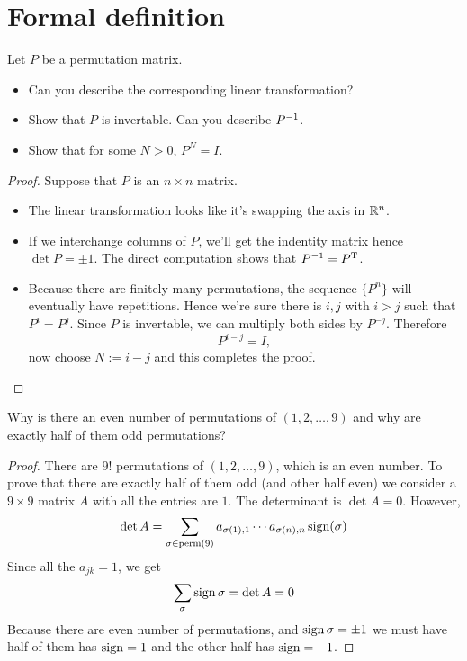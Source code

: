 \section{Formal definition}
\setcounter{exercise}{1}
\begin{exercise}
  Let $P$ be a permutation matrix.
  \begin{itemize}
    \item Can you describe the corresponding linear
      transformation?
    \item Show that $P$ is invertable. Can you describe $P^{-1}$.
    \item Show that for some $N>0$, $P^N=I$.
  \end{itemize}
\end{exercise}
\begin{proof}
  Suppose that $P$ is an $n\times n$ matrix.
  \begin{itemize}
    \item The linear transformation looks like it's swapping 
      the axis in $\R^n$.
    \item If we interchange columns of $P$, we'll get the indentity
      matrix hence $\det P=\pm 1$. The direct computation shows that
      $P^{-1} =P^\mathrm{T}$.
    \item Because there are finitely many permutations, the sequence
      $\{P^n\}$ will eventually have repetitions. Hence we're sure 
      there is $i,j$ with $i>j$ such that $P^i=P^j$. Since $P$ is 
      invertable, we can multiply both sides by $P^{-j}$. Therefore
      \[P^{i-j}=I,\]
      now choose $N:=i-j$ and this completes the proof.
  \end{itemize}
\end{proof}
\begin{exercise}
  Why is there an even number of permutations of $(1,2,\dots,9)$
  and why are exactly half of them odd permutations?
\end{exercise}
\begin{proof}
  There are $9!$ permutations of $(1,2,\dots,9)$, which is an even 
  number. To prove that there are exactly half of them odd 
  (and other half even) we consider a $9\times 9$ matrix $A$ with all 
  the entries are $1$. The determinant is $\det A=0$. However,
  \[
    \det A=\sum_{\sigma\in\operatorname{perm}(9)}
    a_{\sigma(1),1}\cdots a_{\sigma(n),n}\operatorname{sign}(\sigma)
  \]
  Since all the $a_{jk}=1$, we get 
  \[\sum_{\sigma}\operatorname{sign}\sigma=\det A=0\]
  Because there are even number of permutations, and
  $\operatorname{sign}\sigma=\pm 1$ we must have half of them has $\operatorname{sign}=1$ and
  the other half has $\operatorname{sign}=-1$.
\end{proof}

